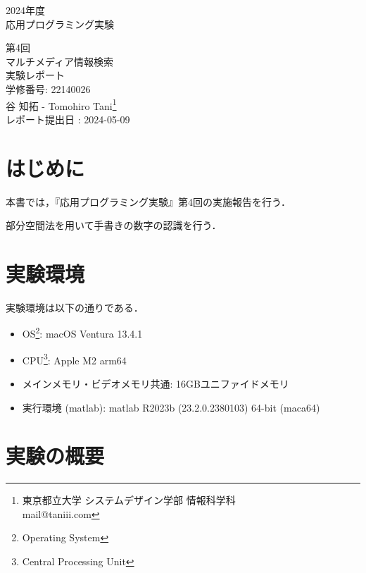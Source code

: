 \documentclass[fleqn, a4paper. 12pt]{jsarticle}
\begin{document}
  \begin{titlepage}
    \begin{center}
      {\Huge 2024年度\\応用プログラミング実験}
      
      \vspace{4cm}
      {\Huge 第4回\\マルチメディア情報検索\\
        実験レポート\\
      }
      \vspace{4cm}
      {\large 学修番号: 22140026\\谷 知拓 - Tomohiro Tani\footnote{東京都立大学 システムデザイン学部 情報科学科 \\ mail@taniii.com} \\}
      \vspace{0.5cm}
      {\large
        レポート提出日 : 2024-05-09 \\
      }
    \end{center}
  \end{titlepage}
  
  \section{はじめに}
    本書では，『応用プログラミング実験』第4回の実施報告を行う．

    部分空間法を用いて手書きの数字の認識を行う．

  \section{実験環境}

    実験環境は以下の通りである．

    \begin{itemize}
      \item OS\footnote{Operating System}: macOS Ventura 13.4.1
      \item CPU\footnote{Central Processing Unit}: Apple M2 arm64\footnotemark[4]
      \item メインメモリ・ビデオメモリ共通: 16GBユニファイドメモリ\footnotemark[4]
      \item 実行環境 (matlab): matlab R2023b (23.2.0.2380103) 64-bit (maca64)
    \end{itemize}

  \section{実験の概要}
\end{document}
